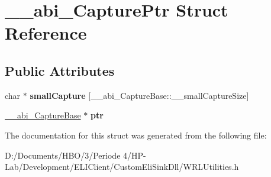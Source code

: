\hypertarget{struct____abi___capture_ptr}{}\section{\+\_\+\+\_\+abi\+\_\+\+Capture\+Ptr Struct Reference}
\label{struct____abi___capture_ptr}
\subsection*{Public Attributes}
\begin{DoxyCompactItemize}
\item 
\mbox{\label{struct____abi___capture_ptr_ae9d2a28b218b44e64b97f197f54f28c2}} 
char $\ast$ {\bfseries small\+Capture} \mbox{[}\+\_\+\+\_\+abi\+\_\+\+Capture\+Base\+::\+\_\+\+\_\+small\+Capture\+Size\mbox{]}
\item 
\mbox{\label{struct____abi___capture_ptr_a28316a998465b531fdc469dfe621c2ff}} 
\hyperlink{struct____abi___capture_base}{\+\_\+\+\_\+abi\+\_\+\+Capture\+Base} $\ast$ {\bfseries ptr}
\end{DoxyCompactItemize}


The documentation for this struct was generated from the following file\+:\begin{DoxyCompactItemize}
\item 
D\+:/\+Documents/\+H\+B\+O/3/\+Periode 4/\+H\+P-\/\+Lab/\+Development/\+E\+L\+I\+Client/\+Custom\+Eli\+Sink\+Dll/W\+R\+L\+Utilities.\+h\end{DoxyCompactItemize}
